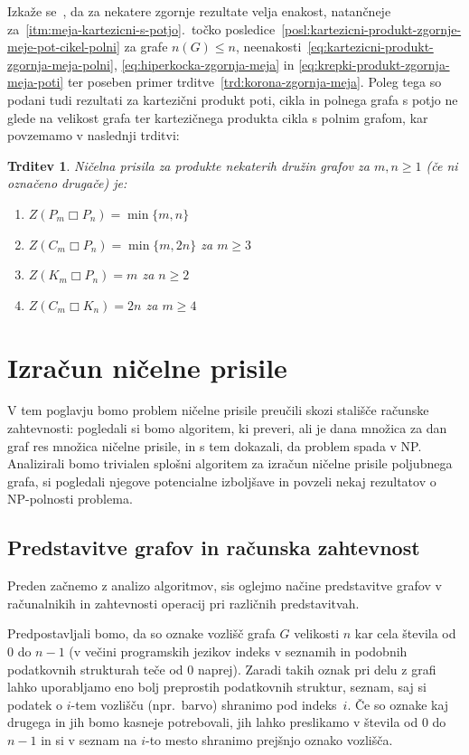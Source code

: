 \documentclass[12pt,a4paper,twoside]{article}
\theoremstyle{definition} %
\theoremstyle{plain} %
\newtheorem{trditev}[definicija]{Trditev}
\numberwithin{equation}{section}  %
\DeclareMathOperator{\boxempty}{\Box}
\begin{document}
Izkaže se~\cite{aim2008minimumrank}, da za nekatere zgornje rezultate velja enakost, natančneje za~\ref{itm:meja-kartezicni-s-potjo}.~točko posledice~\ref{posl:kartezicni-produkt-zgornje-meje-pot-cikel-polni} za grafe $n(G) \leq n$, neenakosti~\eqref{eq:kartezicni-produkt-zgornja-meja-polni}, \eqref{eq:hiperkocka-zgornja-meja} in \eqref{eq:krepki-produkt-zgornja-meja-poti} ter poseben primer trditve~\ref{trd:korona-zgornja-meja}.
Poleg tega so podani tudi rezultati za kartezični produkt poti, cikla in polnega grafa s potjo ne glede na velikost grafa ter kartezičnega produkta cikla s polnim grafom, kar povzemamo v naslednji trditvi:
\begin{trditev}{\cite{aim2008minimumrank}}
    Ničelna prisila za produkte nekaterih družin grafov za $m, n \geq 1$ (če ni označeno drugače) je:
    \begin{enumerate}
        \item $Z(P_m \boxempty P_n) = \min\{m,n\}$
        \item $Z(C_m \boxempty P_n) = \min\{m,2n\}$ za $m \geq 3$
        \item $Z(K_m \boxempty P_n) = m$ za $n \geq 2$
        \item $Z(C_m \boxempty K_n) = 2n$ za $m \geq 4$
    \end{enumerate}
\end{trditev}

\section{Izračun ničelne prisile}
V tem poglavju bomo problem ničelne prisile preučili skozi stališče računske zahtevnosti: pogledali si bomo algoritem, ki preveri, ali je dana množica za dan graf res množica ničelne prisile, in s tem dokazali, da problem spada v NP. Analizirali bomo trivialen splošni algoritem za izračun ničelne prisile poljubnega grafa, si pogledali njegove potencialne izboljšave in povzeli nekaj rezultatov o NP-polnosti problema.

\subsection{Predstavitve grafov in računska zahtevnost}
Preden začnemo z analizo algoritmov, sis oglejmo načine predstavitve grafov v računalnikih in zahtevnosti operacij pri različnih predstavitvah. 

Predpostavljali bomo, da so oznake vozlišč grafa $G$ velikosti $n$ kar cela števila od 0 do $n-1$ (v večini programskih jezikov indeks v seznamih in podobnih podatkovnih strukturah teče od 0 naprej). Zaradi takih oznak pri delu z grafi lahko uporabljamo eno bolj preprostih podatkovnih struktur, seznam, saj si podatek o $i$-tem vozlišču (npr.~barvo) shranimo pod indeks~$i$. Če so oznake kaj drugega in jih bomo kasneje potrebovali, jih lahko preslikamo v števila od 0 do $n-1$ in si v seznam na $i$-to mesto shranimo prejšnjo oznako vozlišča. 
\end{document}
